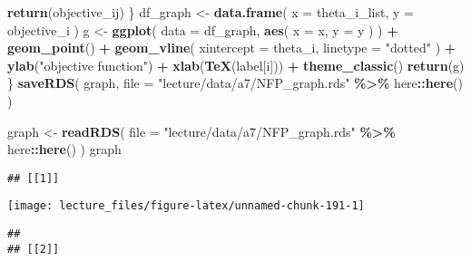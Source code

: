 \documentclass[
]{book}
\newenvironment{Shaded}{\begin{snugshade}}{\end{snugshade}}
\newcommand{\AttributeTok}[1]{\textcolor[rgb]{0.13,0.29,0.53}{#1}}
\newcommand{\FunctionTok}[1]{\textcolor[rgb]{0.13,0.29,0.53}{\textbf{#1}}}
\newcommand{\NormalTok}[1]{#1}
\newcommand{\OtherTok}[1]{\textcolor[rgb]{0.56,0.35,0.01}{#1}}
\newcommand{\SpecialCharTok}[1]{\textcolor[rgb]{0.81,0.36,0.00}{\textbf{#1}}}
\newcommand{\StringTok}[1]{\textcolor[rgb]{0.31,0.60,0.02}{#1}}
\begin{document}
\begin{Shaded}
\begin{Highlighting}[]
               \FunctionTok{return}\NormalTok{(objective\_ij)}
\NormalTok{             \}}
\NormalTok{  df\_graph }\OtherTok{\textless{}{-}} 
    \FunctionTok{data.frame}\NormalTok{(}
      \AttributeTok{x =}\NormalTok{ theta\_i\_list, }
      \AttributeTok{y =}\NormalTok{ objective\_i}
\NormalTok{      ) }
\NormalTok{  g }\OtherTok{\textless{}{-}} 
    \FunctionTok{ggplot}\NormalTok{(}
      \AttributeTok{data =}\NormalTok{ df\_graph, }
      \FunctionTok{aes}\NormalTok{(}
        \AttributeTok{x =}\NormalTok{ x, }
        \AttributeTok{y =}\NormalTok{ y}
\NormalTok{        )}
\NormalTok{      ) }\SpecialCharTok{+} 
    \FunctionTok{geom\_point}\NormalTok{() }\SpecialCharTok{+}
    \FunctionTok{geom\_vline}\NormalTok{(}
      \AttributeTok{xintercept =}\NormalTok{ theta\_i, }
      \AttributeTok{linetype =} \StringTok{"dotted"}
\NormalTok{      ) }\SpecialCharTok{+}
    \FunctionTok{ylab}\NormalTok{(}\StringTok{"objective function"}\NormalTok{) }\SpecialCharTok{+}
    \FunctionTok{xlab}\NormalTok{(}\FunctionTok{TeX}\NormalTok{(label[i]))  }\SpecialCharTok{+} 
    \FunctionTok{theme\_classic}\NormalTok{()}
  \FunctionTok{return}\NormalTok{(g)}
\NormalTok{\}}
\FunctionTok{saveRDS}\NormalTok{(}
\NormalTok{  graph, }
  \AttributeTok{file =} \StringTok{"lecture/data/a7/NFP\_graph.rds"} \SpecialCharTok{\%\textgreater{}\%}\NormalTok{ here}\SpecialCharTok{::}\FunctionTok{here}\NormalTok{()}
\NormalTok{)}
\end{Highlighting}
\end{Shaded}

\begin{Shaded}
\begin{Highlighting}[]
\NormalTok{graph }\OtherTok{\textless{}{-}} 
  \FunctionTok{readRDS}\NormalTok{(}
    \AttributeTok{file =} \StringTok{"lecture/data/a7/NFP\_graph.rds"} \SpecialCharTok{\%\textgreater{}\%}\NormalTok{ here}\SpecialCharTok{::}\FunctionTok{here}\NormalTok{()}
\NormalTok{  )}
\NormalTok{graph}
\end{Highlighting}
\end{Shaded}

\begin{verbatim}
## [[1]]
\end{verbatim}

\begin{center}\texttt{[image: lecture\_files/figure-latex/unnamed-chunk-191-1]} \end{center}

\begin{verbatim}
## 
## [[2]]
\end{verbatim}
\end{document}
